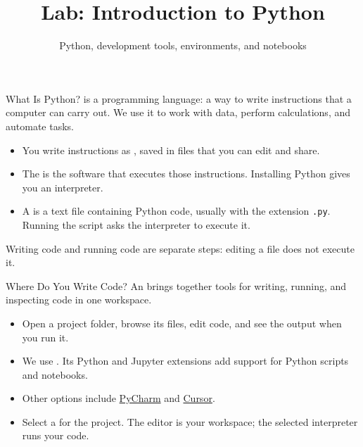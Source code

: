 \newcommand{\CourseTemplatePath}{../../../../../templates/slides/}

\title[Introduction to Python]{Lab: Introduction to Python}
\subtitle{Python, development tools, environments, and notebooks}

\makecoursetitle

\begin{frame}{What Is Python?}
 is a programming language: a way to write instructions that a computer can carry out. We use it to work with data, perform calculations, and automate tasks.
\par\medskip
\begin{itemize}
\item You write instructions as , saved in files that you can edit and share.
\item The  is the software that executes those instructions. Installing Python gives you an interpreter.
\item A  is a text file containing Python code, usually with the extension \texttt{.py}. Running the script asks the interpreter to execute it.
\end{itemize}
\medskip
Writing code and running code are separate steps: editing a file does not execute it.
\end{frame}

\begin{frame}{Where Do You Write Code?}
An  brings together tools for writing, running, and inspecting code in one workspace.
\par\medskip
\begin{itemize}
\item Open a project folder, browse its files, edit code, and see the output when you run it.
\item We use \href{https://code.visualstudio.com/}{}. Its Python and Jupyter extensions add support for Python scripts and notebooks.
\item Other options include \href{https://www.jetbrains.com/pycharm/}{PyCharm} and \href{https://cursor.com/}{Cursor}.
\item Select a  for the project. The editor is your workspace; the selected interpreter runs your code.
\end{itemize}
\end{frame}

